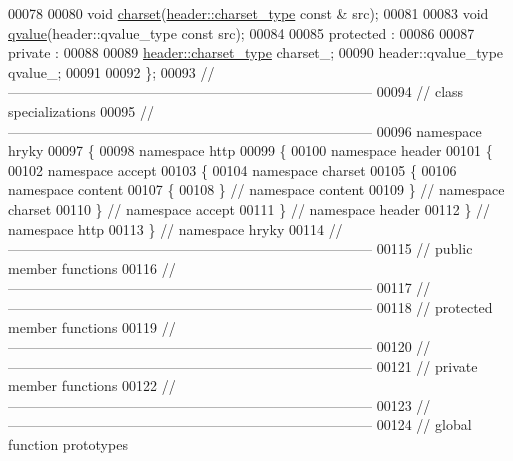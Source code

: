 \begin{DoxyCode}
00078 
00080     \textcolor{keywordtype}{void} \hyperlink{classhryky_1_1http_1_1header_1_1accept_1_1charset_1_1content_1_1_entity_a981d1f39b50c309d16a42447f380f365}{charset}(\hyperlink{classhryky_1_1_vector}{header::charset_type} \textcolor{keyword}{const} & src);
00081 
00083     \textcolor{keywordtype}{void} \hyperlink{classhryky_1_1http_1_1header_1_1accept_1_1charset_1_1content_1_1_entity_a55eea8b6d61470076fc9d2f6108970b4}{qvalue}(header::qvalue\_type \textcolor{keyword}{const} src);
00084 
00085 \textcolor{keyword}{protected} :
00086 
00087 \textcolor{keyword}{private} :
00088 
00089     \hyperlink{classhryky_1_1_vector}{header::charset_type} charset\_;
00090     header::qvalue\_type qvalue\_;
00091 
00092 \};
00093 \textcolor{comment}{//
      ------------------------------------------------------------------------------}
00094 \textcolor{comment}{// class specializations}
00095 \textcolor{comment}{//
      ------------------------------------------------------------------------------}
00096 \textcolor{keyword}{namespace }hryky
00097 \{
00098 \textcolor{keyword}{namespace }http
00099 \{
00100 \textcolor{keyword}{namespace }header
00101 \{
00102 \textcolor{keyword}{namespace }accept
00103 \{
00104 \textcolor{keyword}{namespace }charset
00105 \{
00106 \textcolor{keyword}{namespace }content
00107 \{
00108 \} \textcolor{comment}{// namespace content}
00109 \} \textcolor{comment}{// namespace charset}
00110 \} \textcolor{comment}{// namespace accept}
00111 \} \textcolor{comment}{// namespace header}
00112 \} \textcolor{comment}{// namespace http}
00113 \} \textcolor{comment}{// namespace hryky}
00114 \textcolor{comment}{//
      ------------------------------------------------------------------------------}
00115 \textcolor{comment}{// public member functions}
00116 \textcolor{comment}{//
      ------------------------------------------------------------------------------}
00117 \textcolor{comment}{//
      ------------------------------------------------------------------------------}
00118 \textcolor{comment}{// protected member functions}
00119 \textcolor{comment}{//
      ------------------------------------------------------------------------------}
00120 \textcolor{comment}{//
      ------------------------------------------------------------------------------}
00121 \textcolor{comment}{// private member functions}
00122 \textcolor{comment}{//
      ------------------------------------------------------------------------------}
00123 \textcolor{comment}{//
      ------------------------------------------------------------------------------}
00124 \textcolor{comment}{// global function prototypes}

\end{DoxyCode}
